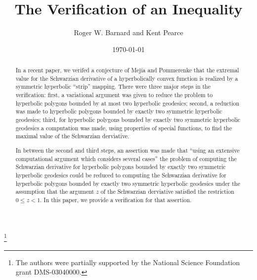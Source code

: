 \documentclass[12pt]{icgft}
\theoremstyle{definition}
\numberwithin{equation}{section}
\begin{document}
\title[The Verification of an Inequality]{The Verification of an Inequality}

\date{\today}

\author{Roger W. Barnard and Kent Pearce}


\address{Department of Mathematics and Statistics \\
Texas Tech University \\
Lubbock, TX 79409--1042}






\thanks{The authors were partially supported by the National Science Foundation grant DMS-03040000.}


\begin{abstract}
In a recent paper, we verifed a conjecture of Mej\'ia and Pommerenke that
the extremal value for the Schwarzian derivative of a hyperbolically convex
function is realized by a symmetric hyperbolic ``strip'' mapping.  There were three
major steps in the verification: first, a variational argument was given to reduce the problem to
hyperbolic polygons bounded by at most two hyperbolic geodesics; second, a reduction was made to
hyperbolic polygons bounded by exactly two symmetric hyperbolic geodesics; third, for hyperbolic
polygons bounded by exactly two symmetric hyperbolic geodesics a computation was made, using properties of special functions, to find the maximal value of the Schwarzian derviative.

In between the second and third steps, an assertion was made that ``using an extensive computational argument which considers several cases'' the problem of computing the Schwarzian derivative for hyperbolic polygons bounded by exactly two symmetric hyperbolic geodesics could be reduced to computing the Schwarzian derivative for hyperbolic polygons bounded by exactly two symmetric hyperbolic geodesics under the assumption that the argument $z$ of the Schwarzian derviative satisfied the restriction
$0 \le z < 1$.  In this paper, we provide a verification for that assertion.

\end{abstract}

\maketitle
\end{document}
